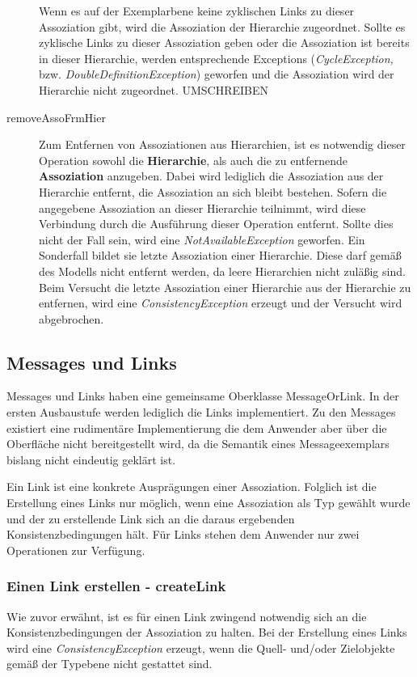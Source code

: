 \begin{description}
Wenn es auf der Exemplarbene keine zyklischen Links zu dieser Assoziation gibt, wird die Assoziation der Hierarchie zugeordnet. Sollte es zyklische Links
zu dieser Assoziation geben oder die Assoziation ist bereits in dieser Hierarchie, werden entsprechende Exceptions (\emph{CycleException,} bzw. \emph{DoubleDefinitionException}) 
geworfen und die Assoziation wird der Hierarchie nicht zugeordnet. UMSCHREIBEN
\item[removeAssoFrmHier] Zum Entfernen von Assoziationen aus Hierarchien, ist es notwendig dieser Operation sowohl die \textbf{Hierarchie}, als auch die zu entfernende 
\textbf{Assoziation} anzugeben. Dabei wird lediglich die Assoziation aus der Hierarchie entfernt, die Assoziation an sich bleibt bestehen. 
Sofern die angegebene Assoziation an dieser Hierarchie teilnimmt, wird diese Verbindung durch die Ausführung dieser Operation entfernt. 
Sollte dies nicht der Fall sein, wird eine \emph{NotAvailableException} geworfen. Ein Sonderfall bildet sie letzte Assoziation einer
Hierarchie. Diese darf gemäß des Modells nicht entfernt werden, da leere Hierarchien nicht zuläßig sind. Beim Versucht die letzte
Assoziation einer Hierarchie aus der Hierarchie zu entfernen, wird eine \emph{ConsistencyException} erzeugt und der Versucht wird abgebrochen. 
\end{description}



\subsection{Messages und Links}

Messages und Links haben eine gemeinsame Oberklasse MessageOrLink. In der
ersten Ausbaustufe werden lediglich die Links implementiert. Zu den Messages existiert eine rudimentäre
Implementierung die dem Anwender aber über die Oberfläche nicht bereitgestellt wird, da die 
Semantik eines Messageexemplars bislang nicht eindeutig geklärt ist. \vspace{15pt}

Ein Link ist eine konkrete Ausprägungen einer Assoziation. 
Folglich ist die Erstellung eines Links nur möglich, wenn eine Assoziation als Typ gewählt wurde und der zu erstellende Link
sich an die  daraus ergebenden Konsistenzbedingungen hält.
Für Links stehen dem Anwender nur zwei Operationen zur Verfügung.

\subsubsection{Einen Link erstellen - createLink}
Wie zuvor erwähnt, ist es für einen Link zwingend notwendig sich an die Konsistenzbedingungen der Assoziation zu halten.
Bei der Erstellung eines Links wird eine \emph{ConsistencyException} erzeugt, wenn die Quell- und/oder Zielobjekte gemäß der Typebene nicht 
gestattet sind.

